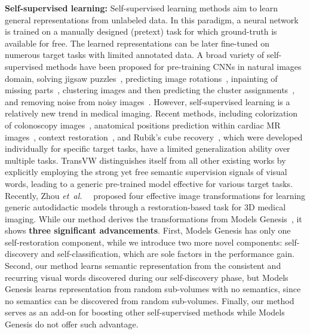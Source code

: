 \documentclass[journal,twoside,web]{ieeecolor}
\newcommand{\etal}{\mbox{\emph{et al.\ }}}
\begin{document}
\smallskip
\noindent\textbf{Self-supervised learning:}  
Self-supervised learning methods aim to learn general representations from unlabeled data. In this paradigm, a neural network is trained on a manually designed (pretext) task for which ground-truth is available for free. The learned representations can be later fine-tuned on numerous target tasks with limited annotated data.
A broad variety of self-supervised methods have been proposed for pre-training CNNs in natural images domain,  solving jigsaw puzzles~\cite{noroozi2016unsupervised}, predicting image rotations~\cite{gidaris2018unsupervised}, inpainting of missing parts~\cite{pathak2016context}, clustering images and then predicting the cluster assignments~\cite{Zhan2020Online,caron2018deep}, and   removing noise from noisy images~\cite{Vincent2008Extracting}.
However, self-supervised learning is a relatively new trend in medical imaging. Recent methods, including 
colorization of colonoscopy images~\cite{ross2018exploiting},  anatomical positions prediction within cardiac MR images~\cite{Bai2019Self}, context restoration~\cite{chen2019self}, and Rubik's cube recovery~\cite{Zhuang2019Self}, which were developed individually for specific target tasks, have a limited generalization ability over multiple tasks. 
TransVW distinguishes itself from all other existing works by explicitly employing the strong yet free semantic supervision signals of visual words, leading to a generic pre-trained model effective for various target tasks. 
Recently, Zhou \etal~\cite{zhou2019models} proposed four effective image transformations for learning generic autodidactic models through a restoration-based task for 3D medical imaging. While our method derives the transformations from Models Genesis~\cite{zhou2019models}, it shows \textbf{three significant advancements}. First, Models Genesis has only one self-restoration component, while we introduce two more novel components: self-discovery and self-classification, which are sole factors in the performance gain. Second, our method learns  semantic representation from the consistent and recurring visual words discovered during our self-discovery phase, but Models Genesis learns representation from random sub-volumes with no semantics, since no semantics can be discovered from random sub-volumes. Finally,  our method serves as an add-on for boosting other self-supervised methods while Models Genesis do not offer such advantage.
\end{document}
